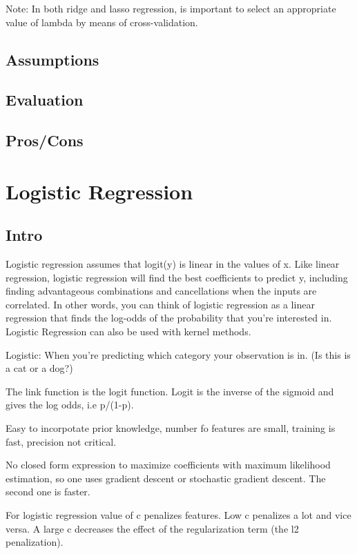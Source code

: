 \documentclass[]{book}
\theoremstyle{definition}
\theoremstyle{definition}
\theoremstyle{definition}
\theoremstyle{remark}
\begin{document}
Note: In both ridge and lasso regression, is important to select an
appropriate value of lambda by means of cross-validation.

\subsection{Assumptions}\label{assumptions-7}

\subsection{Evaluation}\label{evaluation-7}

\subsection{Pros/Cons}\label{proscons-7}

\section{Logistic Regression}\label{logistic-regression}

\subsection{Intro}\label{intro-8}

Logistic regression assumes that logit(y) is linear in the values of x.
Like linear regression, logistic regression will find the best
coefficients to predict y, including finding advantageous combinations
and cancellations when the inputs are correlated. In other words, you
can think of logistic regression as a linear regression that finds the
log-odds of the probability that you're interested in. Logistic
Regression can also be used with kernel methods.

Logistic: When you're predicting which category your observation is in.
(Is this is a cat or a dog?)

The link function is the logit function. Logit is the inverse of the
sigmoid and gives the log odds, i.e p/(1-p).

Easy to incorpotate prior knowledge, number fo features are small,
training is fast, precision not critical.

No closed form expression to maximize coefficients with maximum
likelihood estimation, so one uses gradient descent or stochastic
gradient descent. The second one is faster.

For logistic regression value of c penalizes features. Low c penalizes a
lot and vice versa. A large c decreases the effect of the regularization
term (the l2 penalization).
\end{document}

